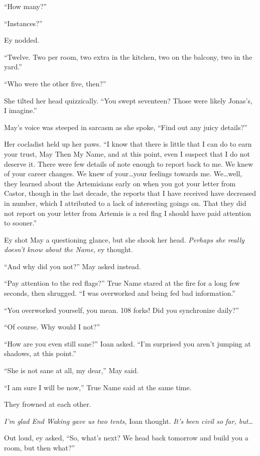``How many?''

``Instances?''

Ey nodded.

``Twelve. Two per room, two extra in the kitchen, two on the balcony, two in the yard.''

``Who were the other five, then?''

She tilted her head quizzically. ``You swept seventeen? Those were likely Jonas's, I imagine.''

May's voice was steeped in sarcasm as she spoke, ``Find out any juicy details?''

Her cocladist held up her paws. ``I know that there is little that I can do to earn your trust, May Then My Name, and at this point, even I suspect that I do not deserve it. There were few details of note enough to report back to me. We knew of your career changes. We knew of your\ldots your feelings towards me. We\ldots well, they learned about the Artemisians early on when you got your letter from Castor, though in the last decade, the reports that I have received have decreased in number, which I attributed to a lack of interesting goings on. That they did not report on your letter from Artemis is a red flag I should have paid attention to sooner.''

Ey shot May a questioning glance, but she shook her head. \emph{Perhaps she really doesn't know about the Name,} ey thought.

``And why did you not?'' May asked instead.

``Pay attention to the red flags?'' True Name stared at the fire for a long few seconds, then shrugged. ``I was overworked and being fed bad information.''

``You overworked yourself, you mean. 108 forks! Did you synchronize daily?''

``Of course. Why would I not?''

``How are you even still sane?'' Ioan asked. ``I'm surprised you aren't jumping at shadows, at this point.''

``She is not sane at all, my dear,'' May said.

``I am sure I will be now,'' True Name said at the same time.

They frowned at each other.

\emph{I'm glad End Waking gave us two tents,} Ioan thought. \emph{It's been civil so far, but\ldots{}}

Out loud, ey asked, ``So, what's next? We head back tomorrow and build you a room, but then what?''

